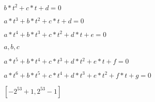 \documentclass{article}
\begin{document}
$b*t^2+c*t+d = 0$
\pagebreak

$a*t^3+b*t^2+c*t+d = 0$
\pagebreak

$a*t^4+b*t^3+c*t^2+d*t+e = 0$
\pagebreak

$a, b, c$
\pagebreak

$a*t^5+b*t^4+c*t^3+d*t^2+e*t+f = 0$
\pagebreak

$a*t^6+b*t^5+c*t^4+d*t^3+e*t^2+f*t+g = 0$
\pagebreak

$[-2^{53}+1, 2^{53}-1]$
\pagebreak
\end{document}
